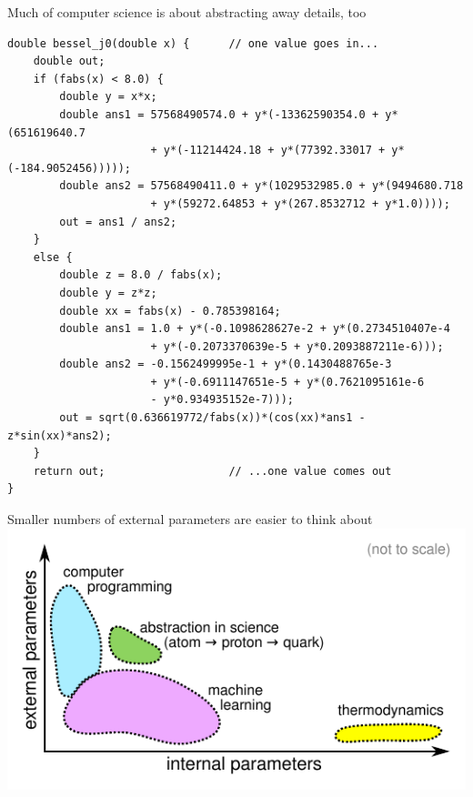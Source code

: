 \documentclass[aspectratio=169]{beamer}
\begin{document}
\begin{frame}[fragile]{Much of computer science is about abstracting away details, too}
\scriptsize
\vspace{0.2 cm}
\begin{verbatim}
double bessel_j0(double x) {      // one value goes in...
    double out;
    if (fabs(x) < 8.0) {
        double y = x*x;
        double ans1 = 57568490574.0 + y*(-13362590354.0 + y*(651619640.7
                      + y*(-11214424.18 + y*(77392.33017 + y*(-184.9052456)))));
        double ans2 = 57568490411.0 + y*(1029532985.0 + y*(9494680.718
                      + y*(59272.64853 + y*(267.8532712 + y*1.0))));
        out = ans1 / ans2;
    }
    else {
        double z = 8.0 / fabs(x);
        double y = z*z;
        double xx = fabs(x) - 0.785398164;
        double ans1 = 1.0 + y*(-0.1098628627e-2 + y*(0.2734510407e-4
                      + y*(-0.2073370639e-5 + y*0.2093887211e-6)));
        double ans2 = -0.1562499995e-1 + y*(0.1430488765e-3
                      + y*(-0.6911147651e-5 + y*(0.7621095161e-6
                      - y*0.934935152e-7)));
        out = sqrt(0.636619772/fabs(x))*(cos(xx)*ans1 - z*sin(xx)*ans2);
    }
    return out;                   // ...one value comes out
}
\end{verbatim}
\end{frame}

\begin{frame}{Smaller numbers of external parameters are easier to think about}
\vspace{0.2 cm}
\includegraphics[width=\linewidth]{internal-vs-external.pdf}
\end{frame}
\end{document}
